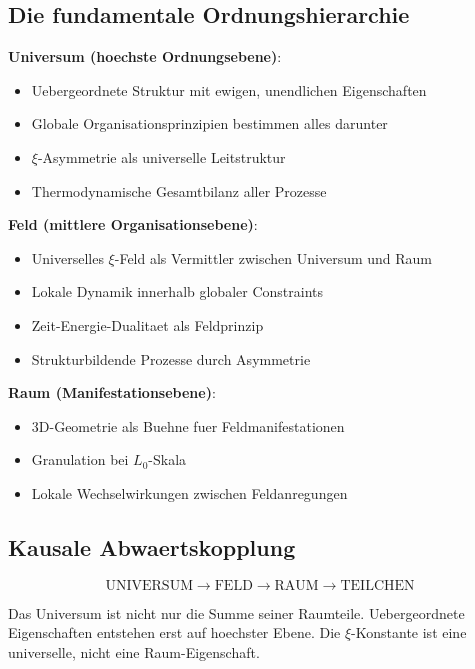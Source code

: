 \documentclass[12pt,a4paper]{article}
\newcommand{\xipar}{\xi}
\newcommand{\Lzero}{L_0}
\theoremstyle{definition}
\theoremstyle{remark}
\begin{document}
	\subsection{Die fundamentale Ordnungshierarchie}
	
	\textbf{Universum (hoechste Ordnungsebene)}:
	\begin{itemize}
		\item Uebergeordnete Struktur mit ewigen, unendlichen Eigenschaften
		\item Globale Organisationsprinzipien bestimmen alles darunter
		\item $\xipar$-Asymmetrie als universelle Leitstruktur
		\item Thermodynamische Gesamtbilanz aller Prozesse
	\end{itemize}
	
	\textbf{Feld (mittlere Organisationsebene)}:
	\begin{itemize}
		\item Universelles $\xipar$-Feld als Vermittler zwischen Universum und Raum
		\item Lokale Dynamik innerhalb globaler Constraints
		\item Zeit-Energie-Dualitaet als Feldprinzip
		\item Strukturbildende Prozesse durch Asymmetrie
	\end{itemize}
	
	\textbf{Raum (Manifestationsebene)}:
	\begin{itemize}
		\item 3D-Geometrie als Buehne fuer Feldmanifestationen
		\item Granulation bei $\Lzero$-Skala
		\item Lokale Wechselwirkungen zwischen Feldanregungen
	\end{itemize}
	
	\subsection{Kausale Abwaertskopplung}
	
	\begin{equation}
		\text{UNIVERSUM} \rightarrow \text{FELD} \rightarrow \text{RAUM} \rightarrow \text{TEILCHEN}
	\end{equation}
	
	Das Universum ist nicht nur die Summe seiner Raumteile. Uebergeordnete Eigenschaften entstehen erst auf hoechster Ebene. Die $\xipar$-Konstante ist eine universelle, nicht eine Raum-Eigenschaft.
	
\end{document}
